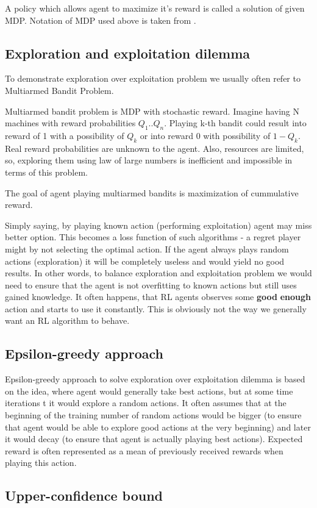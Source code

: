 A policy which allows agent to maximize it's reward is called a solution of given MDP. Notation of MDP used above is taken from \cite{Thomas15a}.
\subsection{Exploration and exploitation dilemma}
To demonstrate exploration over exploitation problem we usually often refer to Multiarmed Bandit Problem.

Multiarmed bandit problem is MDP with stochastic reward. Imagine having N machines with reward probabilities $Q_1 .. Q_n$. Playing k-th bandit could result into reward of 1 with a possibility of $Q_k$ or into reward 0 with possibility of $1 - Q_k$. Real reward probabilities are unknown to the agent. Also, resources are limited, so, exploring them using law of large numbers is inefficient and impossible in terms of this problem.

The goal of agent playing multiarmed bandits is maximization of cummulative reward.

Simply saying, by playing known action (performing exploitation) agent may miss better option. This becomes a loss function of such algorithms - a regret player might by not selecting the optimal action. If the agent always plays random actions (exploration) it will be completely useless and would yield no good results.
In other words, to balance exploration and exploitation problem we would need to ensure that the agent is not overfitting to known actions but still uses gained knowledge. It often happens, that RL agents observes some \textbf{good} \textbf{enough} action and starts to use it constantly. This is obviously not the way we generally want an RL algorithm to behave.
\subsection{Epsilon-greedy approach}
Epsilon-greedy approach to solve exploration over exploitation dilemma is based on the idea, where agent would generally take best actions, but at some time iterations t it would explore a random actions. It often assumes that at the beginning of the training number of random actions would be bigger (to ensure that agent would be able to explore good actions at the very beginning) and later it would decay (to ensure that agent is actually playing best actions). Expected reward is often represented as a mean of previously received rewards when playing this action. 

\subsection{Upper-confidence bound}

